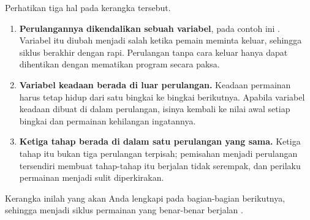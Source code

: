 Perhatikan tiga hal pada kerangka tersebut.

\begin{enumerate}
  \item \textbf{Perulangannya dikendalikan sebuah variabel}, pada contoh ini
        . Variabel itu diubah menjadi salah ketika pemain
        meminta keluar, sehingga siklus berakhir dengan rapi. Perulangan tanpa
        cara keluar hanya dapat dihentikan dengan mematikan program secara
        paksa.
  \item \textbf{Variabel keadaan berada di luar perulangan.} Keadaan permainan
        harus tetap hidup dari satu bingkai ke bingkai berikutnya. Apabila
        variabel keadaan dibuat di dalam perulangan, isinya kembali ke nilai
        awal setiap bingkai dan permainan kehilangan ingatannya.
  \item \textbf{Ketiga tahap berada di dalam satu perulangan yang sama.} Ketiga
        tahap itu bukan tiga perulangan terpisah; pemisahan menjadi perulangan
        tersendiri membuat tahap-tahap itu berjalan tidak serempak, dan
        perilaku permainan menjadi sulit diperkirakan.
\end{enumerate}

Kerangka inilah yang akan Anda lengkapi pada bagian-bagian berikutnya,
sehingga menjadi siklus permainan yang benar-benar berjalan
\cite{nystrom-gameloop,sweigart-mg}.
